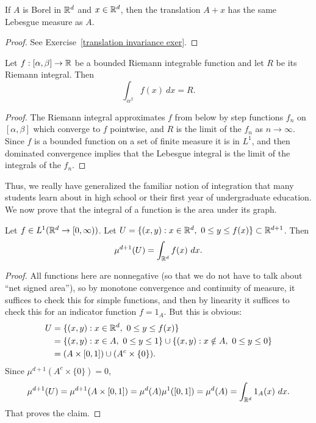 \begin{theorem}
\label{translation invariance in Rd}
If $A$ is Borel in $\mathbb{R}^d$ and $x \in \mathbb{R}^d$, then the translation $A + x$ has the same Lebesgue measure as $A$.
\end{theorem}
\begin{proof}
See Exercise~\ref{translation invariance exer}.
\end{proof}

\begin{theorem}
Let $f: [\alpha, \beta] \to \mathbb{R}$ be a bounded Riemann integrable function and let $R$ be its Riemann integral. Then
\[\int_{\alpha^\beta} f(x)~dx = R.\]
\end{theorem}
\begin{proof}
The Riemann integral approximates $f$ from below by step functions $f_{n}$ on $[\alpha, \beta]$ which converge to $f$ pointwise, and $R$ is the limit of the $f_{n}$ as $n \to \infty$.
Since $f$ is a bounded function on a set of finite measure it is in $L^1$, and then dominated convergence implies that the Lebesgue integral is the limit of the integrals of the $f_{n}$.
\end{proof}

Thus, we really have generalized the familiar notion of integration that many students learn about in high school or their first year of undergraduate education.
We now prove that the integral of a function is the area under its graph.

\begin{theorem}
Let $f \in L^1(\mathbb{R}^{d} \to [0, \infty))$.
Let $U = \{(x, y): x \in \mathbb{R}^d, ~0 \leq y \leq f(x)\} \subset \mathbb{R}^{d+1}$.
Then
\[\mu^{d+1}(U) = \int_{\mathbb{R}^d} f(x)~dx.\]
\end{theorem}
\begin{proof}
All functions here are nonnegative (so that we do not have to talk about ``net signed area''), so by monotone convergence and continuity of measure, it suffices to check this for simple functions, and then by linearity it suffices to check this for an indicator function $f = 1_A$.
But this is obvious:
\begin{align*}U &= \{(x, y): x \in \mathbb{R}^d, ~0 \leq y \leq f(x)\} \\&= \{(x, y): x \in A, ~0 \leq y \leq 1\} \cup \{(x, y): x \notin A, ~0 \leq y \leq 0\} \\&= (A \times [0, 1]) \cup (A^{c} \times \{0\}).\end{align*}
Since $\mu^{d+1}(A^{c} \times \{0\}) = 0$,
\[\mu^{d+1}(U) = \mu^{d+1}(A \times [0, 1]) = \mu^d(A) \mu^1([0, 1]) = \mu^d(A) = \int_{\mathbb{R}^d} 1_A(x)~dx.\]
That proves the claim.
\end{proof}

